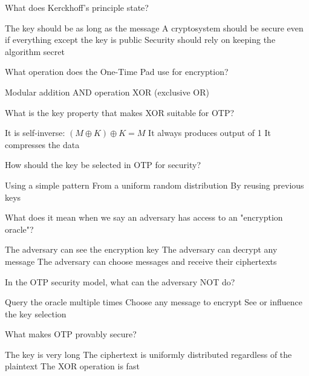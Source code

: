 \documentclass[10pt,a4paper,american]{exam}
\begin{document}
\begin{questions}
	\question What does Kerckhoff's principle state?
	\begin{randomizechoices}
		\choice The key should be as long as the message
		\CorrectChoice A cryptosystem should be secure even if everything except the key is public
		\choice Security should rely on keeping the algorithm secret
	\end{randomizechoices}

	\question What operation does the One-Time Pad use for encryption?
	\begin{randomizechoices}
		\choice Modular addition
		\choice AND operation
		\CorrectChoice XOR (exclusive OR)
	\end{randomizechoices}

	\question What is the key property that makes XOR suitable for OTP?
	\begin{randomizechoices}
		\CorrectChoice It is self-inverse: $(M \oplus K) \oplus K = M$
		\choice It always produces output of 1
		\choice It compresses the data
	\end{randomizechoices}

	\question How should the key be selected in OTP for security?
	\begin{randomizechoices}
		\choice Using a simple pattern
		\CorrectChoice From a uniform random distribution
		\choice By reusing previous keys
	\end{randomizechoices}

	\question What does it mean when we say an adversary has access to an "encryption oracle"?
	\begin{randomizechoices}
		\choice The adversary can see the encryption key
		\choice The adversary can decrypt any message
		\CorrectChoice The adversary can choose messages and receive their ciphertexts
	\end{randomizechoices}

	\question In the OTP security model, what can the adversary NOT do?
	\begin{randomizechoices}
		\choice Query the oracle multiple times
		\choice Choose any message to encrypt
		\CorrectChoice See or influence the key selection
	\end{randomizechoices}

	\question What makes OTP provably secure?
	\begin{randomizechoices}
		\choice The key is very long
		\CorrectChoice The ciphertext is uniformly distributed regardless of the plaintext
		\choice The XOR operation is fast
	\end{randomizechoices}


\end{questions}
\end{document}
